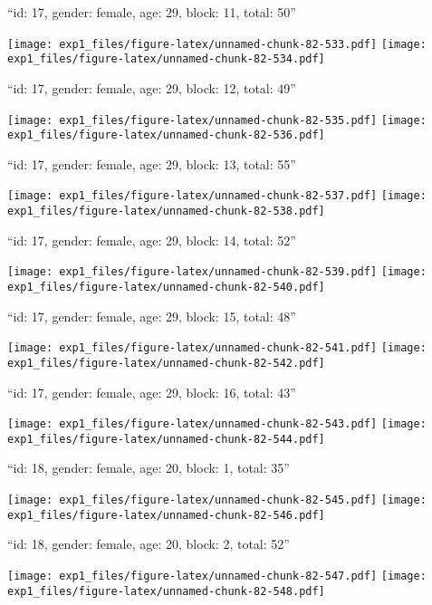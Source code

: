 \documentclass[11pt,,]{article}
\begin{document}
\newpage
[1] 

``id: 17, gender: female, age: 29, block: 11, total: 50''

\texttt{[image: exp1\_files/figure-latex/unnamed-chunk-82-533.pdf]}
\texttt{[image: exp1\_files/figure-latex/unnamed-chunk-82-534.pdf]}

\newpage
[1] 

``id: 17, gender: female, age: 29, block: 12, total: 49''

\texttt{[image: exp1\_files/figure-latex/unnamed-chunk-82-535.pdf]}
\texttt{[image: exp1\_files/figure-latex/unnamed-chunk-82-536.pdf]}

\newpage
[1] 

``id: 17, gender: female, age: 29, block: 13, total: 55''

\texttt{[image: exp1\_files/figure-latex/unnamed-chunk-82-537.pdf]}
\texttt{[image: exp1\_files/figure-latex/unnamed-chunk-82-538.pdf]}

\newpage
[1] 

``id: 17, gender: female, age: 29, block: 14, total: 52''

\texttt{[image: exp1\_files/figure-latex/unnamed-chunk-82-539.pdf]}
\texttt{[image: exp1\_files/figure-latex/unnamed-chunk-82-540.pdf]}

\newpage
[1] 

``id: 17, gender: female, age: 29, block: 15, total: 48''

\texttt{[image: exp1\_files/figure-latex/unnamed-chunk-82-541.pdf]}
\texttt{[image: exp1\_files/figure-latex/unnamed-chunk-82-542.pdf]}

\newpage
[1] 

``id: 17, gender: female, age: 29, block: 16, total: 43''

\texttt{[image: exp1\_files/figure-latex/unnamed-chunk-82-543.pdf]}
\texttt{[image: exp1\_files/figure-latex/unnamed-chunk-82-544.pdf]}

\newpage
[1] 

``id: 18, gender: female, age: 20, block: 1, total: 35''

\texttt{[image: exp1\_files/figure-latex/unnamed-chunk-82-545.pdf]}
\texttt{[image: exp1\_files/figure-latex/unnamed-chunk-82-546.pdf]}

\newpage
[1] 

``id: 18, gender: female, age: 20, block: 2, total: 52''

\texttt{[image: exp1\_files/figure-latex/unnamed-chunk-82-547.pdf]}
\texttt{[image: exp1\_files/figure-latex/unnamed-chunk-82-548.pdf]}
\end{document}
